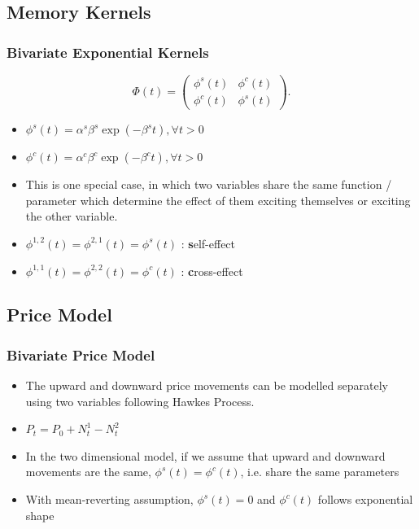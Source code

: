 \documentclass{beamer}
\begin{document}
\subsection{Memory Kernels}
\begin{frame}
\frametitle{Bivariate Exponential Kernels}
\[
\Phi(t) = 
\left( \begin{array}{ccc}
\phi^s(t) & \phi^c(t) \\
\phi^c(t) & \phi^s(t) \end{array} \right).
\]
\begin{itemize}
	\item $\phi^s(t) = \alpha^s \beta^s \exp(-\beta^s t), \forall t > 0$
	\item $\phi^c(t) = \alpha^c \beta^c \exp(-\beta^c t), \forall t > 0$
	\item This is one special case, in which two variables share the same function / parameter which determine the effect of them exciting themselves or exciting the other variable.
	\item $\phi^{1,2}(t) = \phi^{2,1}(t) = \phi^s(t)$ : \textbf{s}elf-effect
	\item $\phi^{1,1}(t) = \phi^{2,2}(t) = \phi^c(t)$ : \textbf{c}ross-effect
\end{itemize}
\end{frame}

\subsection{Price Model}
\begin{frame}
\frametitle{Bivariate Price Model}
\begin{itemize}
	\item The upward and downward price movements can be modelled separately using two variables following Hawkes Process.
	\item $P_t = P_0 + N_t^1 - N_t^2$
	\item In the two dimensional model, if we assume that upward and downward movements are the same, $\phi^s(t) = \phi^c(t)$, i.e. share the same parameters
	\item With mean-reverting assumption, $\phi^s(t) = 0$ and $\phi^c(t)$ follows exponential shape
\end{itemize}
\end{frame}
\end{document}
